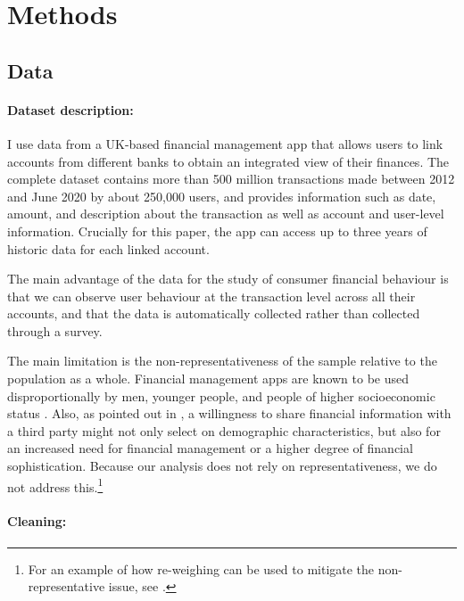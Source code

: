 
\section{Methods}%
\label{sec:data}

\subsection{Data}%
\label{sub:data}

\paragraph{Dataset description:}%
\label{par:dataset_description}

I use data from a UK-based financial management app that allows users to link
accounts from different banks to obtain an integrated view of their finances.
The complete dataset contains more than 500 million transactions made between
2012 and June 2020 by about 250,000 users, and provides information such as
date, amount, and description about the transaction as well as account and
user-level information. Crucially for this paper, the app can access up to
three years of historic data for each linked account.

The main advantage of the data for the study of consumer financial behaviour is
that we can observe user behaviour at the transaction level across all their
accounts, and that the data is automatically collected rather than collected
through a survey.

The main limitation is the non-representativeness of the sample relative to the
population as a whole. Financial management apps are known to be used
disproportionally by men, younger people, and people of higher socioeconomic
status \citep{carlin2019generational}. Also, as pointed out in
\citet{gelman2014harnessing}, a willingness to share financial information with
a third party might not only select on demographic characteristics, but also
for an increased need for financial management or a higher degree of financial
sophistication. Because our analysis does not rely on representativeness, we do
not address this.\footnote{For an example of how re-weighing can be used to
mitigate the non-representative issue, see \citet{bourquin2020effects}.}


\paragraph{Cleaning:}%
\label{par:cleaning}

